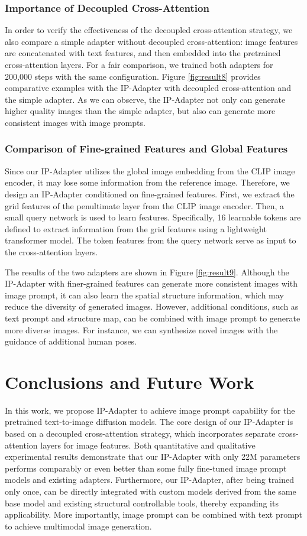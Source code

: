 \documentclass{article}
\begin{document}
\subsubsection{Importance of Decoupled Cross-Attention}
In order to verify the effectiveness of the decoupled cross-attention strategy, we also compare a simple adapter without decoupled cross-attention: image features are concatenated with text features, and then embedded into the pretrained cross-attention layers. For a fair comparison, we trained both adapters for 200,000 steps with the same configuration. Figure \ref{fig:result8} provides comparative examples with the IP-Adapter with decoupled cross-attention and the simple adapter. As we can observe, the IP-Adapter not only can generate higher quality images than the simple adapter, but also can generate more consistent images with image prompts.
\subsubsection{Comparison of Fine-grained Features and Global Features}
Since our IP-Adapter utilizes the global image embedding from the CLIP image encoder, it may lose some information from the reference image. Therefore, we design an IP-Adapter conditioned on fine-grained features. First, we extract the grid features of the penultimate layer from the CLIP image encoder. Then, a small query network is used to learn features. Specifically, 16 learnable tokens are defined to extract information from the grid features using a lightweight transformer model. The token features from the query network serve as input to the cross-attention layers.

The results of the two adapters are shown in Figure \ref{fig:result9}. Although the IP-Adapter with finer-grained features can generate more consistent images with image prompt, it can also learn the spatial structure information, which may reduce the diversity of generated images. However, additional conditions, such as text prompt and structure map, can be combined with image prompt to generate more diverse images. For instance, we can synthesize novel images with the guidance of additional human poses.


\section{Conclusions and Future Work}
In this work, we propose IP-Adapter to achieve image prompt capability for the pretrained text-to-image diffusion models. The core design of our IP-Adapter is based on a decoupled cross-attention strategy, which incorporates separate cross-attention layers for image features. Both quantitative and qualitative experimental results demonstrate that our IP-Adapter with only 22M parameters performs comparably or even better than some fully fine-tuned image prompt models and existing adapters. Furthermore, our IP-Adapter, after being trained only once, can be directly integrated with custom models derived from the same base model and existing structural controllable tools, thereby expanding its applicability. More importantly, image prompt can be combined with text prompt to achieve multimodal image generation.
\end{document}
